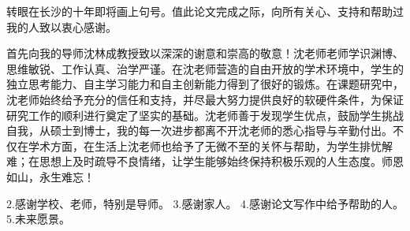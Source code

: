 

\begin{ack}
	
转眼在长沙的十年即将画上句号。值此论文完成之际，向所有关心、支持和帮助过我的人致以衷心感谢。

首先向我的导师沈林成教授致以深深的谢意和崇高的敬意！沈老师老师学识渊博、思维敏锐、工作认真、治学严谨。在沈老师营造的自由开放的学术环境中，学生的独立思考能力、自主学习能力和自主创新能力得到了很好的锻炼。在课题研究中，沈老师始终给予充分的信任和支持，并尽最大努力提供良好的软硬件条件，为保证研究工作的顺利进行奠定了坚实的基础。沈老师善于发现学生优点，鼓励学生挑战自我，从硕士到博士，我的每一次进步都离不开沈老师的悉心指导与辛勤付出。不仅在学术方面，在生活上沈老师也给予了无微不至的关怀与帮助，为学生排忧解难；在思想上及时疏导不良情绪，让学生能够始终保持积极乐观的人生态度。师恩如山，永生难忘！



2.感谢学校、老师，特别是导师。
3.感谢家人。
4.感谢论文写作中给予帮助的人。
5.未来愿景。

\end{ack}
